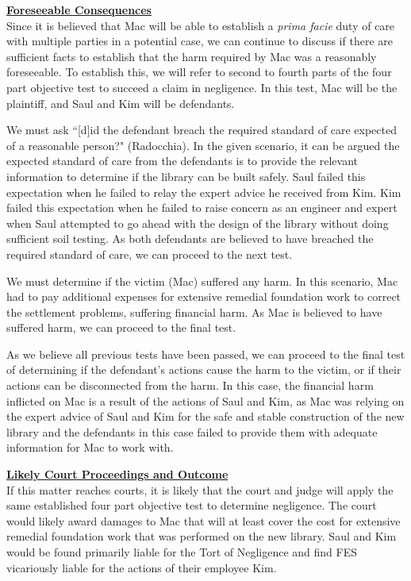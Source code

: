 \documentclass[12pt,letterpaper]{article}
\begin{document}
\par
\textbf{\underline{Foreseeable Consequences}}\\
\indent
Since it is believed that Mac will be able to establish a \textit{prima facie} duty of care with multiple parties in a potential case, we can continue to discuss if there are sufficient facts to establish that the harm required by Mac was a reasonably foreseeable. To establish this, we will refer to second to fourth parts of the four part objective test to succeed a claim in negligence. In this test, Mac will be the plaintiff, and Saul and Kim will be defendants.\par
We must ask ``[d]id the defendant breach the required standard of care expected of a reasonable person?" (Radocchia). In the given scenario, it can be argued the expected standard of care from the defendants is to provide the relevant information to determine if the library can be built safely. Saul failed this expectation when he failed to relay the expert advice he received from Kim. Kim failed this expectation when he failed to raise concern as an engineer and expert when Saul attempted to go ahead with the design of the library without doing sufficient soil testing. As both defendants are believed to have breached the required standard of care, we can proceed to the next test.\par
We must determine if the victim (Mac) suffered any harm. In this scenario, Mac had to pay additional expenses for extensive remedial foundation work to correct the settlement problems, suffering financial harm. As Mac is believed to have suffered harm, we can proceed to the final test.\par
As we believe all previous tests have been passed, we can proceed to the final test of determining if the defendant's actions cause the harm to the victim, or if their actions can be disconnected from the harm. In this case, the financial harm inflicted on Mac is a result of the actions of Saul and Kim, as Mac was relying on the expert advice of Saul and Kim for the safe and stable construction of the new library and the defendants in this case failed to provide them with adequate information for Mac to work with.

\par
\textbf{\underline{Likely Court Proceedings and Outcome}}\\
\indent
If this matter reaches courts, it is likely that the court and judge will apply the same established four part objective test to determine negligence. The court would likely award damages to Mac that will at least cover the cost for extensive remedial foundation work that was performed on the new library. Saul and Kim would be found primarily liable for the Tort of Negligence and find FES vicariously liable for the actions of their employee Kim. 
\end{document}
